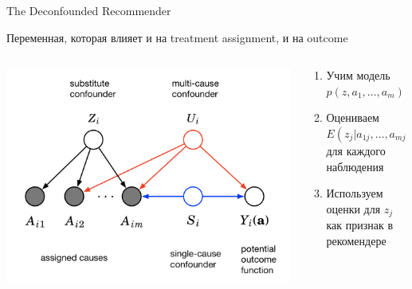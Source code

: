 \documentclass[11pt,aspectratio=169]{beamer}
\begin{document}
\begin{frame}{The Deconfounded Recommender \cite{DECONF}}

\vfill

\begin{tcolorbox}[colback=gray!5,colframe=gray!80,title=Confounder]
Переменная, которая влияет и на treatment assignment, и на outcome
\end{tcolorbox}

\begin{columns}
\begin{column}{0.4\textwidth}
\begin{center}
\includegraphics[scale=0.2]{images/blessings.png}
\end{center}
\end{column}

\begin{column}{0.5\textwidth}
\begin{enumerate}
\item Учим модель $p(z, a_1, \ldots, a_m)$
\item Оцениваем $E(z_j | a_{1j}, \ldots, a_{mj})$ для каждого наблюдения
\item Используем оценки для $z_j$ как признак в рекомендере
\end{enumerate}
\end{column}
\end{columns}

\begin{center}

\end{center}

\end{frame}
\end{document}
